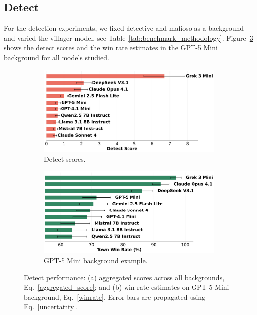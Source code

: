 \documentclass{article}
\begin{document}
\subsection{Detect}

For the detection experiments, we fixed detective and mafioso as a background and varied the villager model, see Table~\ref{tab:benchmark_methodology}. Figure~\ref{fig:detect_example} shows the detect scores and the win rate estimates in the GPT-5 Mini background for all models studied.

\begin{figure}[htbp]
    \centering
    \begin{subfigure}[b]{0.48\textwidth}
        \centering
        \includegraphics[width=\textwidth]{../results/scores_detect.png}
        \caption{Detect scores.}
        \label{fig:detect_score}
    \end{subfigure}
    \hfill
    \begin{subfigure}[b]{0.48\textwidth}
        \centering
        \includegraphics[width=\textwidth]{../results/win_rates_detect_gpt-5_mini.png}
        \caption{GPT-5 Mini background example.}
        \label{fig:detect_gpt_example}
    \end{subfigure}
    \caption{Detect performance: (a) aggregated scores across all backgrounds, Eq.~\eqref{aggregated_score}; and (b) win rate estimates on GPT-5 Mini background, Eq.~\eqref{winrate}. Error bars are propagated using Eq.~\eqref{uncertainty}.}
    \label{fig:detect_example}
\end{figure}
\end{document}
